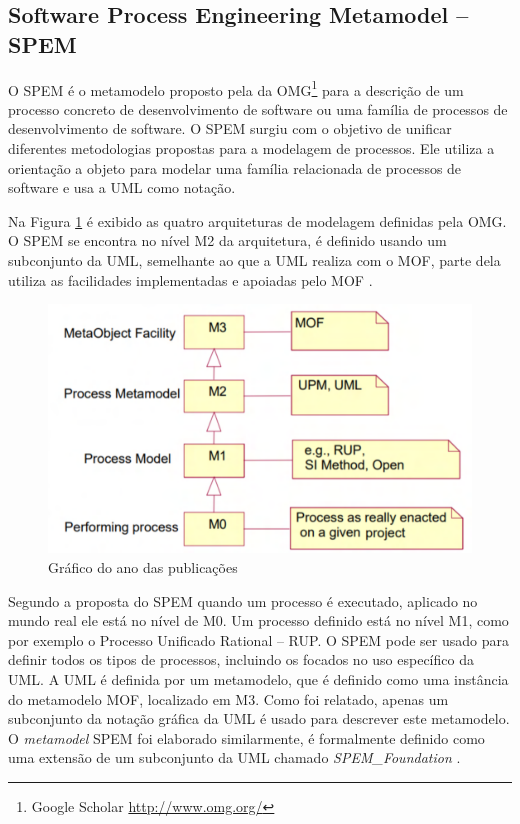 \subsection{Software Process Engineering Metamodel -- SPEM}


O SPEM é o metamodelo proposto pela da OMG\footnote{Google Scholar \url{http://www.omg.org/}} para a descrição de um processo concreto de desenvolvimento de software ou uma família de processos de desenvolvimento de software. O SPEM surgiu com o objetivo de unificar diferentes metodologias propostas para a modelagem de processos. Ele utiliza a orientação a objeto para modelar uma família relacionada de processos de software e usa a UML como notação.

Na Figura \ref{fig:niveisSpem} é exibido as quatro arquiteturas de modelagem definidas pela OMG. O SPEM se encontra no nível M2 da arquitetura, é definido usando um subconjunto da UML, semelhante ao que a UML realiza com o MOF, parte dela utiliza as facilidades implementadas e apoiadas pelo MOF \cite{genvigir2003modelagem}.  

\begin{figure}[!htb]
	\caption{Gráfico do ano das publicações}\label{fig:niveisSpem}
	\begin{center}
		\includegraphics[scale=0.350]{img/spemNiveis}
	\end{center}
\end{figure}

Segundo a proposta do SPEM quando um processo é executado, aplicado no mundo real ele está no nível de M0. Um processo definido está no nível M1, como por exemplo o Processo Unificado Rational -- RUP. O SPEM pode ser usado para definir todos os tipos de processos, incluindo os focados no uso específico da UML. A UML é definida por um metamodelo, que é definido como uma instância do metamodelo MOF, localizado em M3. Como foi relatado, apenas um subconjunto da notação gráfica da UML é usado para descrever este metamodelo. O \textit{metamodel} SPEM foi elaborado similarmente, é formalmente definido como uma extensão de um subconjunto da UML chamado \textit{SPEM\_Foundation} \cite{genvigir2003modelagem}. 
